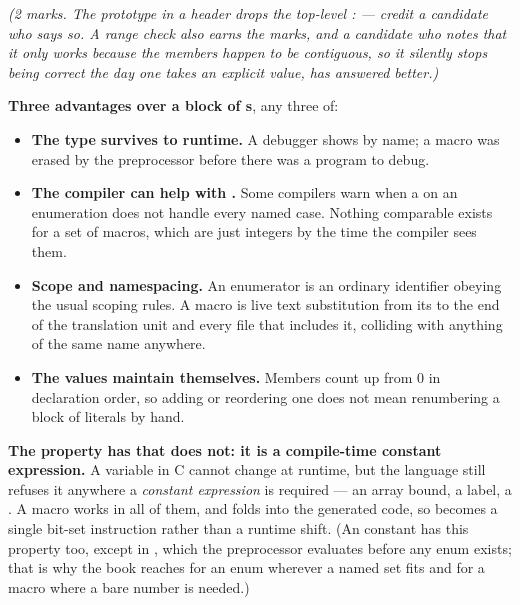 {\itshape (2 marks. The prototype in a header drops the top-level :\newline
{} --- credit a candidate who says so. A range
check  also earns the marks, and a candidate who notes that
it only works because the members happen to be contiguous, so it silently stops being correct the
day one takes an explicit value, has answered better.)\par}

\medskip
\textbf{Three advantages over a block of s}, any three of:
\begin{itemize}
  \item \textbf{The type survives to runtime.} A debugger shows  by name; a
    macro was erased by the preprocessor before there was a program to debug.
  \item \textbf{The compiler can help with .} Some compilers warn when a 
    on an enumeration does not handle every named case. Nothing comparable exists for a set of
    macros, which are just integers by the time the compiler sees them.
  \item \textbf{Scope and namespacing.} An enumerator is an ordinary identifier obeying the usual
    scoping rules. A macro is live text substitution from its  to the end of the
    translation unit and every file that includes it, colliding with anything of the same name
    anywhere.
  \item \textbf{The values maintain themselves.} Members count up from 0 in declaration order, so
    adding or reordering one does not mean renumbering a block of literals by hand.
\end{itemize}

\textbf{The property  has that  does not: it is a compile-time
constant expression.} A  variable in C cannot change at runtime, but the language still
refuses it anywhere a \emph{constant expression} is required --- an array bound, a 
label, a . A macro works in all of them, and folds into the generated code, so
 becomes a single bit-set instruction rather than a runtime shift. (An
 constant has this property too, except in , which the preprocessor evaluates
before any enum exists; that is why the book reaches for an enum wherever a named set fits and for a
macro where a bare number is needed.) 

